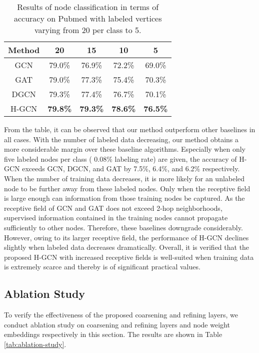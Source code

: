 \documentclass{article}
\begin{document}
\begin{table}
	\centering
	\small
    \begin{tabular}{ccccc}
		\toprule
		Method & 20    & 15    & 10    & 5 \\ \midrule
		GCN   & 79.0\% & 76.9\% & 72.2\% & 69.0\% \\
		GAT   & 79.0\% & 77.3\% & 75.4\% & 70.3\% \\
		DGCN  & 79.3\% & 77.4\% & 76.7\% & 70.1\% \\
		H-GCN & {\bf 79.8\%} & {\bf 79.3\%} & {\bf 78.6\%} & {\bf 76.5\%} \\
    	\bottomrule
    \end{tabular}
	\caption{Results of node classification in terms of accuracy on Pubmed with labeled vertices varying from 20 per class to 5.}
	\label{tab:labeled-data}
\end{table}

From the table, it can be observed that our method outperform other baselines in all cases. With the number of labeled data decreasing, our method obtains a more considerable margin over these baseline algorithms. Especially when only five labeled nodes per class ( 0.08\% labeling rate) are given, the accuracy of H-GCN exceeds GCN, DGCN, and GAT by 7.5\%, 6.4\%, and 6.2\% respectively. When the number of training data decreases, it is more likely for an unlabeled node to be further away from these labeled nodes. Only when the receptive field is large enough can information from those training nodes be captured. As the receptive field of GCN and GAT does not exceed 2-hop neighborhoods, supervised information contained in the training nodes cannot propagate sufficiently to other nodes. Therefore, these baselines downgrade considerably. However, owing to its larger receptive field, the performance of H-GCN declines slightly when labeled data decreases dramatically. Overall, it is verified that the proposed H-GCN with increased receptive fields is well-suited when training data is extremely scarce and thereby is of significant practical values.

\subsection{Ablation Study}
To verify the effectiveness of the proposed coarsening and refining layers, we conduct ablation study on coarsening and refining layers and node weight embeddings respectively in this section. The results are shown in Table \ref{tab:ablation-study}.
\end{document}
